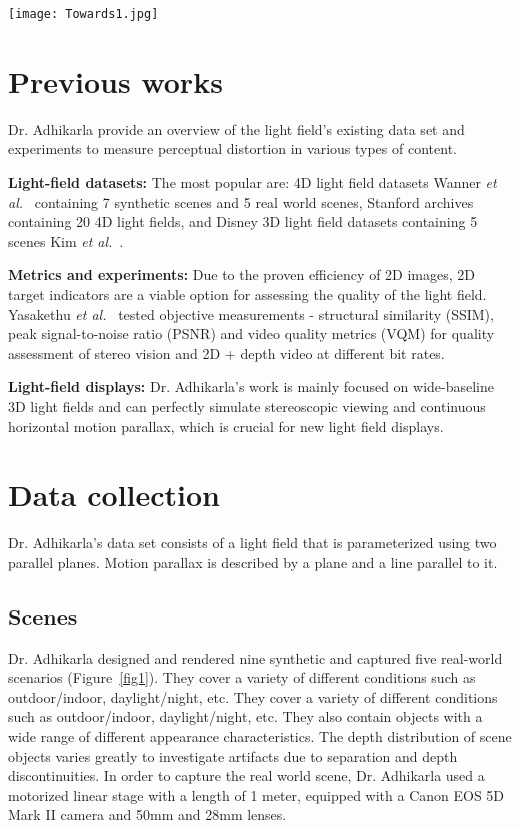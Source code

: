 \documentclass[10pt,twocolumn,letterpaper]{article}
\begin{document}
        \begin{figure*}[ht]
        \begin{center}
        \texttt{[image: Towards1.jpg]}
        \end{center}
        \caption{Representative images of all light fields in our collection. Below each image representative EPIs are presented}
        \label{fig1}
    \end{figure*}
    \section{Previous works}
    Dr. Adhikarla provide an overview of the light field's existing data set and experiments to measure perceptual distortion in various types of content. 
    \par 
    \textbf{Light-field datasets:} The most popular are: 4D light field datasets Wanner \emph{et al.}~\cite{[42]} containing 7 synthetic scenes and 5 real world scenes, Stanford archives containing 20 4D light fields, and Disney 3D light field datasets containing 5 scenes Kim \emph{et al.}~\cite{[14]}.
    \par
    \textbf{Metrics and experiments:} Due to the proven efficiency of 2D images, 2D target indicators are a viable option for assessing the quality of the light field. Yasakethu \emph{et al.}~\cite{[46]} tested objective measurements - structural similarity (SSIM), peak signal-to-noise ratio (PSNR) and video quality metrics (VQM) for quality assessment of stereo vision and 2D + depth video at different bit rates. 
    \par
    \textbf{Light-field displays:} Dr. Adhikarla's work is mainly focused on wide-baseline 3D light fields and can perfectly simulate stereoscopic viewing and continuous horizontal motion parallax, which is crucial for new light field displays.
    
    \section{Data collection}
   Dr. Adhikarla's data set consists of a light field that is parameterized using two parallel planes. Motion parallax is described by a plane and a line parallel to it.
   \subsection{Scenes}
   Dr. Adhikarla designed and rendered nine synthetic and captured five real-world scenarios (Figure~\ref{fig1}). They cover a variety of different conditions such as outdoor/indoor, daylight/night, etc. They cover a variety of different conditions such as outdoor/indoor, daylight/night, etc. They also contain objects with a wide range of different appearance characteristics. The depth distribution of scene objects varies greatly to investigate artifacts due to separation and depth discontinuities. In order to capture the real world scene, Dr. Adhikarla used a motorized linear stage with a length of 1 meter, equipped with a Canon EOS 5D Mark II camera and 50mm and 28mm lenses.
{
    \small
    
    
}
\end{document}
